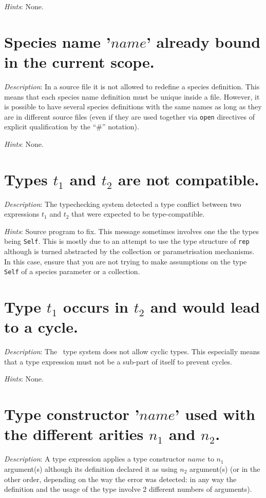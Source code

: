 {\em Hints}: None.



\section*{Species name '$name$' already bound in the current scope.}
{\em Description}: In a source file it is not allowed to redefine a
species definition. This means that each species name definition must
be unique inside a file. However, it is possible to have several species
definitions with the same names as long as they are in different
source files (even if they are used together via {\tt open} directives
of explicit qualification by the ``\#'' notation).

{\em Hints}: None.



\section*{Types $t_1$ and $t_2$ are not compatible.}
{\em Description}: The typechecking system detected a type conflict
between two expressions $t_1$ and $t_2$ that were expected to be
type-compatible.

{\em Hints}: Source program to fix. This message sometimes involves
one the the types being {\tt Self}. This is mostly due to an attempt
to use the type structure of {\tt rep} although is turned abstracted
by the collection or parametrisation mechanisms. In this case, ensure
that you are not trying to make assumptions on the type {\tt Self} of
a species parameter or a collection.



\section*{Type $t_1$ occurs in $t_2$ and would lead to a cycle.}
{\em Description}: The \focal\ type system does not allow cyclic
types. This especially means that a type expression must not be a
sub-part of itself to prevent cycles.

{\em Hints}: None.



\section*{Type constructor '$name$' used with the different arities
  $n_1$ and $n_2$.}
{\em Description}: A type expression applies a type constructor $name$
to $n_1$ argument(s) although its definition declared it as using $n_2$
argument(s) (or in the other order, depending on the way the error was
detected: in any way the definition and the usage of the type involve
2 different numbers of arguments).

